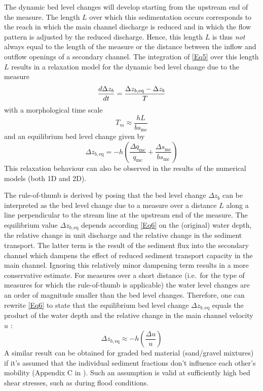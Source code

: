 The dynamic bed level changes will develop starting from the upstream end of the measure.
The length $L$ over which this sedimentation occurs corresponds to the reach in which the main channel discharge is reduced and in which the flow pattern is adjusted by the reduced discharge.
Hence, this length $L$ is thus \emph{not} always equal to the length of the measure or the distance between the inflow and outflow openings of a secondary channel.
The integration of \autoref{Eq5} over this length $L$ results in a relaxation model for the dynamic bed level change due to the measure
%
\begin{equation}
\diff{\Delta z_b}{t} = \frac{\Delta z_{b,\text{eq}} - \Delta z_b}{T}
\label{Eq5dif}
\end{equation}
%
with a morphological time scale 
%
\begin{equation}
T_m \approx \frac{h L}{b s_\text{mc}}
\label{Eq5T}
\end{equation}
%
and an equilibrium bed level change  given by
%
\begin{equation}
\Delta z_{b,\text{eq}} = -h \left ( \frac{\Delta q_\text{mc}}{q_\text{mc}} + \frac{\Delta s_\text{mc}}{b s_\text{mc}} \right )
\label{Eq6}
\end{equation}
%
This relaxation behaviour can also be observed in the results of the numerical models (both 1D and 2D).

The rule-of-thumb is derived by posing that the bed level change $\Delta z_b$ can be interpreted as the bed level change due to a measure over a distance $L$ along a line perpendicular to the stream line at the upstream end of the measure.
The equilibrium value $\Delta z_{b,\text{eq}}$ depends according \autoref{Eq6} on the (original) water depth, the relative change in unit discharge and the relative change in the sediment transport.
The latter term is the result of the sediment flux into the secondary channel which dampens the effect of reduced sediment transport capacity in the main channel.
Ignoring this relatively minor dampening term results in a more conservative estimate.
For measures over a short distance (i.e.~for the type of measures for which the rule-of-thumb is applicable) the water level changes are an order of magnitude smaller than the bed level changes.
Therefore, one can rewrite \autoref{Eq6} to state that the equilibrium bed level change $\Delta z_{b,\text{eq}}$ equals the product of the water depth and the relative change in the main channel velocity $u$ :
%
\begin{equation}
\Delta z_{b,\text{eq}} \approx -h \left ( \frac{\Delta u}{u} \right )
\label{Eq6v2}
\end{equation}
%
A similar result can be obtained for graded bed material (sand/gravel mixtures) if it's assumed that the individual sediment fractions don't influence each other's mobility (Appendix C in \citet{Waterdienst2008}).
Such an assumption is valid at sufficiently high bed shear stresses, such as during flood conditions.

